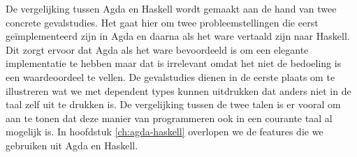De vergelijking tussen Agda en Haskell wordt gemaakt aan de hand van twee
concrete gevalstudies. Het gaat hier om twee probleemstellingen die eerst
geïmplementeerd zijn in Agda en daarna als het ware vertaald zijn naar Haskell.
Dit zorgt ervoor dat Agda als het ware bevoordeeld is om een elegante
implementatie te hebben maar dat is irrelevant omdat het niet de bedoeling is
een waardeoordeel te vellen. De gevalstudies dienen in de eerste plaats om te
illustreren wat we met dependent types kunnen uitdrukken dat anders niet in de
taal zelf uit te drukken is. De vergelijking tussen de twee talen is er vooral
om aan te tonen dat deze manier van programmeren ook in een courante taal al
mogelijk is. In hoofdstuk \ref{ch:agda-haskell} overlopen we de features die we
gebruiken uit Agda en Haskell.
